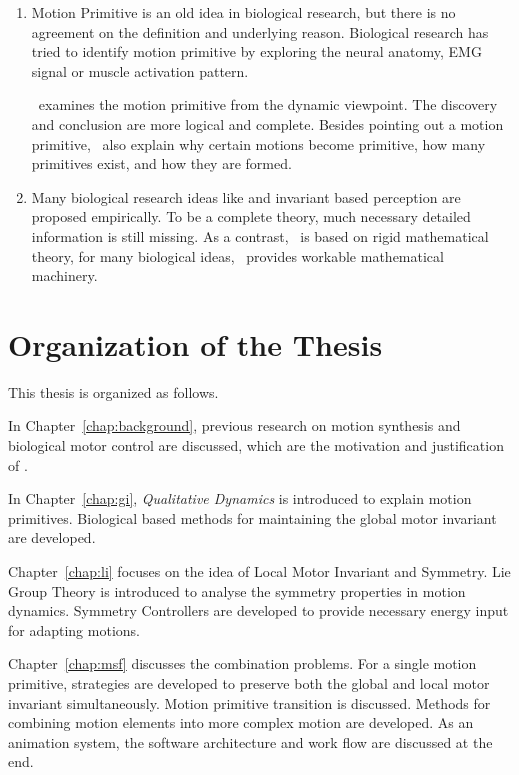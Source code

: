 \begin{enumerate}
\item 
Motion Primitive is an old idea in biological research, but there is no agreement on the definition and underlying reason.
Biological research has tried to identify motion primitive by exploring the neural anatomy, EMG signal or muscle activation pattern.

{\moit}\ examines the motion primitive from the dynamic viewpoint.
The discovery and conclusion are more logical and complete.
Besides pointing out a motion primitive, {\moit}\ also explain why certain motions become primitive, how many primitives exist, and how they are formed.


\item Many biological research ideas like \cpg and invariant based perception are proposed empirically. 
To be a complete theory, much necessary detailed information is still missing.
As a contrast, {\moit}\ is based on rigid mathematical theory, for many biological ideas, {\moit}\ provides workable mathematical machinery.

\end{enumerate}







\section{Organization of the Thesis}

This thesis is organized as follows.
 
In Chapter~\ref{chap:background}, previous research on motion synthesis and biological motor control are discussed, which are the motivation and justification of {\moit}.
 
In Chapter~\ref{chap:gi}, \emph{Qualitative Dynamics} is introduced to explain motion primitives. 
Biological based  methods for maintaining the global motor invariant are developed.

Chapter~\ref{chap:li} focuses on the idea of Local Motor Invariant and Symmetry.
Lie Group Theory is  introduced  to analyse the symmetry properties in motion dynamics.
Symmetry Controllers are developed to provide necessary energy input for adapting motions.
 


Chapter~\ref{chap:msf} discusses the combination problems.
For a single motion primitive,  strategies are developed to preserve both the global and local motor invariant simultaneously.
Motion primitive transition is discussed.
Methods for combining motion elements into more complex motion are developed.
As an animation system, the software architecture and work flow are discussed at the end.

